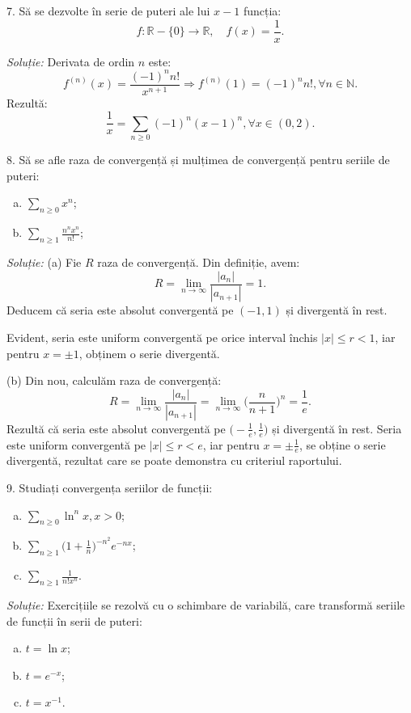 \documentclass[11pt,a4paper]{article}
\newcommand\ds{\displaystyle}
\newcommand\NN{\mathbb{N}}
\newcommand\RR{\mathbb{R}}
\theoremstyle{dotless}
\theoremstyle{dotlessdr}
\begin{document}
\vspace{1cm}

7. Să se dezvolte în serie de puteri ale lui $x - 1$ funcția:
\[
  f : \RR - \{ 0 \} \to \RR, \quad f(x) = \frac{1}{x}.
\]

\emph{Soluție:} Derivata de ordin $n$ este:
\[
  f^{(n)}(x) = \frac{(-1)^n n!}{x^{n+1}} \Rightarrow f^{(n)}(1) = (-1)^n n!, \forall n \in \NN.
\]
Rezultă:
\[
  \frac{1}{x} = \sum_{n \geq 0} (-1)^n (x - 1)^n, \forall x \in (0, 2).
\]

\vspace{1cm}

8. Să se afle raza de convergență și mulțimea de convergență pentru seriile de puteri:
\begin{enumerate}[(a)]
\item $\ds\sum_{n \geq 0} x^n$;
\item $\ds\sum_{n \geq 1} \frac{n^n x^n}{n!}$;
\end{enumerate}

\emph{Soluție:} (a) Fie $R$ raza de convergență. Din definiție, avem:
\[
  R = \lim_{n \to \infty} \frac{|a_n|}{|a_{n + 1}|} = 1.
\]
Deducem că seria este absolut convergentă pe $(-1, 1)$ și divergentă în rest.

Evident, seria este uniform convergentă pe orice interval închis $|x| \leq r < 1$, iar
pentru $x = \pm 1$, obținem o serie divergentă.

(b) Din nou, calculăm raza de convergență:
\[
  R = \lim_{n \to \infty} \frac{|a_n|}{|a_{n + 1}|} = %
  \lim_{n \to \infty} \Big( \frac{n}{n + 1} \Big)^n = \frac{1}{e}.
\]
Rezultă că seria este absolut convergentă pe $\Big( -\frac{1}{e}, \frac{1}{e} \Big)$
și divergentă în rest. Seria este uniform convergentă pe $|x| \leq r < e$, iar
pentru $x = \pm \frac{1}{e}$, se obține o serie divergentă, rezultat care
se poate demonstra cu criteriul raportului.

\vspace{1cm}

9. Studiați convergența seriilor de funcții:
\begin{enumerate}[(a)]
\item $\ds\sum_{n \geq 0} \ln^n x, x > 0$;
\item $\ds\sum_{n \geq 1} \Big( 1 + \frac{1}{n} \Big)^{-n^2} e^{-nx}$;
\item $\ds\sum_{n \geq 1} \frac{1}{n! x^n}$.
\end{enumerate}

\emph{Soluție:} Exercițiile se rezolvă cu o schimbare de variabilă, care
transformă seriile de funcții în serii de puteri:
\begin{enumerate}[(a)]
\item $t = \ln x$;
\item $t = e^{-x}$;
\item $t = x^{-1}$.
\end{enumerate}
\end{document}

